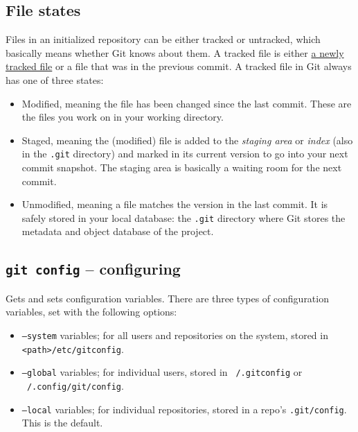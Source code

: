 \documentclass[table, xcdraw]{article}%
\begin{document}
\subsection{File states} \label{states}

Files in an initialized repository can be either tracked or untracked, which basically means whether Git knows about them. A tracked file is either \hyperref[add]{a newly tracked file} or a file that was in the previous commit. A tracked file in Git always has one of three states:

\begin{itemize}
    \item Modified, meaning the file has been changed since the last commit. These are the files you work on in your working directory.
    \item Staged, meaning the (modified) file is added to the \textit{staging area} or \textit{index} (also in the \texttt{.git} directory) and marked in its current version to go into your next commit snapshot. The staging area is basically a waiting room for the next commit.
    \item Unmodified, meaning a file matches the version in the last commit. It is safely stored in your local database: the \texttt{.git} directory where Git stores the metadata and object database of the project.
\end{itemize}

\subsection{\texttt{git config} -- configuring} \label{config}

Gets and sets configuration variables. There are three types of configuration variables, set with the following options:

\begin{itemize}
    \item \texttt{--system} variables; for all users and repositories on the system, stored in \texttt{<path>/etc/gitconfig}.
    \item \texttt{--global} variables; for individual users, stored in \texttt{~/.gitconfig} or \texttt{~/.config/git/config}.
    \item \texttt{--local} variables; for individual repositories, stored in a repo's \texttt{.git/config}. This is the default.
\end{itemize}
\end{document}
